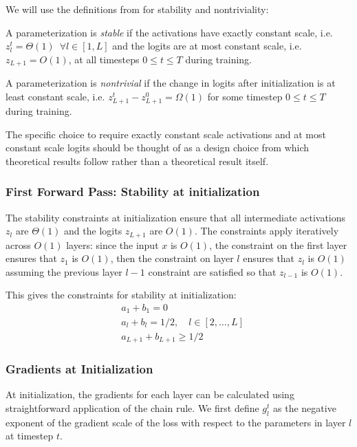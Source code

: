 We will use the definitions from \citet{yang2021tensoriv} for stability and nontriviality:
\begin{appendixdef}
A parameterization is \emph{stable} if the activations have exactly constant scale, i.e. $z_l^t = \Theta(1) \enspace \forall l \in [1,L]$ and the logits are at most constant scale, i.e. $z_{L+1} = O(1)$, at all timesteps $0 \leq t \leq T$ during training.
\end{appendixdef}
\begin{appendixdef}
A parameterization is \emph{nontrivial} if the change in logits after initialization is at least constant scale, i.e. $z_{L+1}^t - z_{L+1}^0 = \Omega(1)$ for some timestep $0 \leq t \leq T$ during training.
\end{appendixdef}
The specific choice to require exactly constant scale activations and at most constant scale logits should be thought of as a design choice from which theoretical results follow rather than a theoretical result itself.

\subsubsection{First Forward Pass: Stability at initialization}
\label{app:theory_first_forward}
The stability constraints at initialization ensure that all intermediate activations $z_l$ are $\Theta(1)$ and the logits $z_{L+1}$ are $O(1)$. The constraints apply iteratively across $O(1)$ layers: since the input $x$ is $O(1)$, the constraint on the first layer ensures that $z_1$ is $O(1)$, then the constraint on layer $l$ ensures that $z_l$ is $O(1)$ assuming the previous layer $l-1$ constraint are satisfied so that $z_{l-1}$ is $O(1)$.

This gives the constraints for stability at initialization:
\begin{align*}
    &a_1 + b_1 = 0\\
    &a_l + b_l = 1/2,\quad l \in [2, \ldots, L]\\
    &a_{L+1} + b_{L+1} \geq 1/2
\end{align*}

\subsubsection{Gradients at Initialization}
\label{app:theory_gradients_init}
At initialization, the gradients for each layer can be calculated using straightforward application of the chain rule. We first define $g_l^t$ as the negative exponent of the gradient scale of the loss with respect to the parameters in layer $l$ at timestep $t$.

